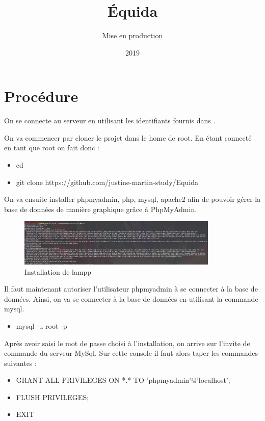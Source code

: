 \documentclass[report]{BetterDocument}
\title{Équida}
\subtitle{Mise en production}
\date{2019}
\newcommand{\bdd}{base de données}
\begin{document}
	\pageDeGarde

	\chapter{Procédure}

		On se connecte au serveur en utilisant les identifiants fournis dans .

		On va commencer par cloner le projet dans le home de root. En étant connecté en tant que root on fait donc :

		\begin{itemize}
			\item{cd}
			\item{git clone https://github.com/justine-martin-study/Equida}
		\end{itemize}

		On va ensuite installer phpmyadmin, php, mysql, apache2 afin de pouvoir gérer la base de données de manière graphique grâce à PhpMyAdmin.

		\begin{figure}[H]
			\centering\includegraphics[width=0.85\textwidth, keepaspectratio]{res/install-lampp.png}
			\caption{Installation de lampp}
		\end{figure}

		Il faut maintenant autoriser l'utilisateur phpmyadmin à se connecter à la \bdd{}. Ainsi, on va se connecter à la \bdd{} en utilisant la commande mysql.

		\begin{itemize}
			\item{mysql -u root -p}
		\end{itemize}

		Après avoir saisi le mot de passe choisi à l'installation, on arrive sur l'invite de commande du serveur MySql. Sur cette console il faut alors taper les commandes suivantes :

		\begin{itemize}
			\item{GRANT ALL PRIVILEGES ON *.* TO 'phpmyadmin'@'localhost';}
			\item{FLUSH PRIVILEGES;}
			\item{EXIT}
		\end{itemize}
\end{document}

